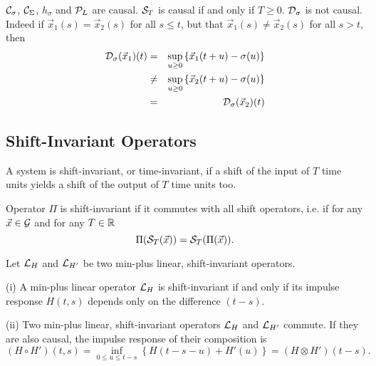 $\mathcal C_{\sigma}$, $\mathcal C_{\Sigma}$, $h_\sigma$ and  $\mathcal P_L$ are causal. $\mathcal S_T$ is causal if and only if $T \geq 0$. $\mathcal D_{\sigma}$ is not causal.
 Indeed if $\vec{x}_1(s) = \vec{x}_2(s)$ for all $s \leq t$, but that $\vec{x}_1(s) \neq \vec{x}_2(s)$ for all $s > t$, then
\begin{eqnarray*}
\mathcal D_{\sigma}(\vec{x}_1)(t) & = & \sup_{u \geq 0} \left\{ \vec{x}_1(t+u) - \sigma(u) \right\} \\
                 & \neq & \sup_{u \geq 0} \left\{ \vec{x}_2(t+u) - \sigma(u) \right\} \\
                & = & \mathcal D_{\sigma}(\vec{x}_2)(t)
\end{eqnarray*}


\subsection{Shift-Invariant Operators}


A system is shift-invariant, or time-invariant, if a shift of the input of $T$ time units yields a shift of the output of $T$ time units too.

\begin{definition}
Operator $\Pi$ is shift-invariant if it commutes with all shift operators, i.e. if for any $\vec{x} \in \mathcal G$ and for any $T \in \mathbb{R}$
$$ \Pi(\mathcal S_T(\vec{x})) = \mathcal S_T (\Pi(\vec{x})). $$
\end{definition}

\begin{theorem}

Let $\mathcal L_{H}$ and  $\mathcal L_{H'}$ be two  min-plus linear, shift-invariant operators.

(i) A min-plus linear operator $\mathcal L_{H}$ is shift-invariant if and only if its impulse response $H(t,s)$ depends only on the difference $(t-s)$.


(ii) Two min-plus linear, shift-invariant operators $\mathcal L_{H}$ and $\mathcal L_{H'}$ commute. If they are also causal,
the impulse response of their composition is
$$ (H \circ H')(t,s) = \inf_{0 \leq u \leq t-s} \left\{ H(t-s-u) + H'(u) \right\} =  (H \otimes H')(t-s) . $$

\end{theorem}

